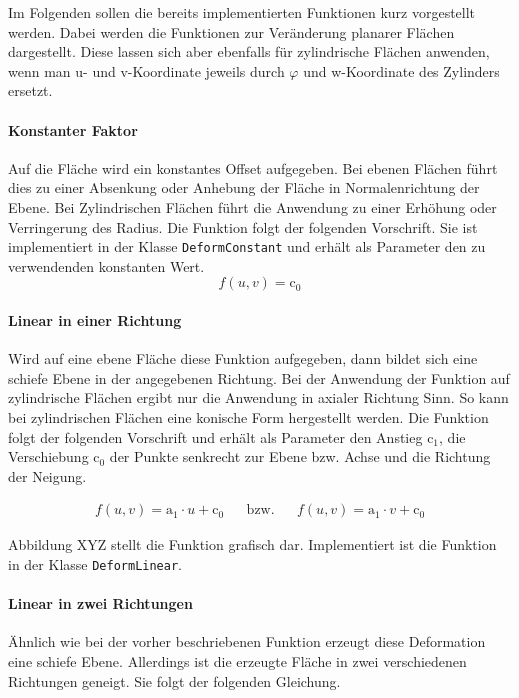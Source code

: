 Im Folgenden sollen die bereits implementierten Funktionen kurz vorgestellt werden. Dabei werden die Funktionen zur Veränderung planarer Flächen dargestellt. Diese lassen sich aber ebenfalls für zylindrische Flächen anwenden, wenn man u- und v-Koordinate jeweils durch $\varphi$ und w-Koordinate des Zylinders ersetzt. 

\paragraph{Konstanter Faktor} Auf die Fläche wird ein konstantes Offset aufgegeben. Bei ebenen Flächen führt dies zu einer Absenkung oder Anhebung der Fläche in Normalenrichtung der Ebene. Bei Zylindrischen Flächen führt die Anwendung zu einer Erhöhung oder Verringerung des Radius. 
Die Funktion folgt der folgenden Vorschrift. Sie ist implementiert in der Klasse \verb|DeformConstant| und erhält als Parameter den zu verwendenden konstanten Wert. 
\begin{equation}\label{eq:constant}
	f(u,v) = \mathrm{c_0}
\end{equation}

\paragraph{Linear in einer Richtung} Wird auf eine ebene Fläche diese Funktion aufgegeben, dann bildet sich eine schiefe Ebene in der angegebenen Richtung. Bei der Anwendung der Funktion auf zylindrische Flächen ergibt nur die Anwendung in axialer Richtung Sinn. So kann bei zylindrischen Flächen eine konische Form hergestellt werden. Die Funktion folgt der folgenden Vorschrift und erhält als Parameter den Anstieg $\mathrm{c_1}$, die Verschiebung $\mathrm{c_0}$ der Punkte senkrecht zur Ebene bzw. Achse und die Richtung der Neigung. 

\begin{equation}	
	\begin{aligned}\label{eq:linear}
		f(u,v) = \mathrm{a_1}\cdot u+\mathrm{c_0}&&\mathrm{bzw.}&&f(u,v) = \mathrm{a_1}\cdot v+\mathrm{c_0}
	\end{aligned}
\end{equation}

Abbildung XYZ stellt die Funktion grafisch dar. Implementiert ist die Funktion in der Klasse \verb|DeformLinear|.

\paragraph{Linear in zwei Richtungen} Ähnlich wie bei der vorher beschriebenen Funktion erzeugt diese Deformation eine schiefe Ebene. Allerdings ist die erzeugte Fläche in zwei verschiedenen Richtungen geneigt. Sie folgt der folgenden Gleichung. 

